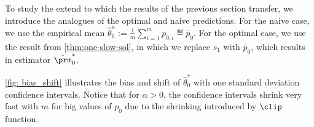 
 To study the extend to which the results of the previous section transfer, we
introduce the analogues of the optimal and naive predictions. For the naive
case, we use the empirical mean $\hat{\theta}_0^n := \frac{1}{m} \sum_{i=1}^m
p_{0, i} \eqdef \bar{p}_0$. For the optimal case, we use the result from
\cref{thm:one-slow-sol}, in which we replace $s_1$ with $\bar{p}_0$, which
results in estimator $\hat{\prm}^*_0$.

 \cref{fig: bias_shift} illustrates the bias and shift of $\hat{\theta}^*_0$
with one standard deviation confidence intervals.
Notice that for $\alpha > 0$, the confidence intervals shrink very fast with
$m$ for big values of $p_0$ due to the shrinking introduced by $\clip$
function.


%

